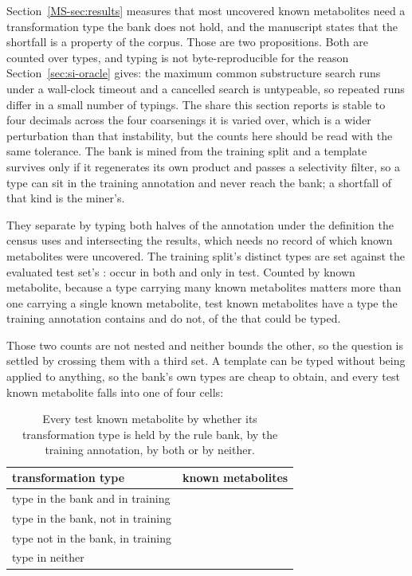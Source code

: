 \documentclass[journal=jcisd8,manuscript=suppinfo,layout=onecolumn]{achemso}
\begin{document}
Section~\ref{MS-sec:results} measures that most uncovered known metabolites need a transformation type the
bank does not hold, and the manuscript states that the shortfall is a property of the corpus. Those
are two propositions. Both are counted over types, and typing is not byte-reproducible for the
reason Section~\ref{sec:si-oracle} gives: the maximum common substructure search runs under a
wall-clock timeout and a cancelled search is untypeable, so repeated runs differ in a small number
of typings. The share this section reports is stable to four decimals across the four coarsenings
it is varied over, which is a wider perturbation than that instability, but the counts here should
be read with the same tolerance. The bank is mined from the training split and a template survives
only if it
regenerates its own product and passes a selectivity filter, so a type can sit in the training
annotation and never reach the bank; a shortfall of that kind is the miner's.

They separate by typing both halves of the annotation under the definition the census uses and
intersecting the results, which needs no record of which known metabolites were uncovered. The training
split's \numTypeoverlapTraintypes{} distinct types are set against the evaluated test set's
\numTypeoverlapTesttypes: \numTypeoverlapShared{} occur in both and
\numTypeoverlapAbsenttypes{} only in test. Counted by known metabolite, because a type carrying many
known metabolites matters more than one carrying a single known metabolite,
\numTypeoverlapPresentrefs{} test known metabolites have a type the training annotation contains and
\numTypeoverlapAbsentrefs{} do not, \numTypeoverlapAbsentsharePct{} of the
\numTypeoverlapTyped{} that could be typed.

Those two counts are not nested and neither bounds the other, so the question is settled by
crossing them with a third set. A template can be typed
without being applied to anything, so the bank's own \numTypeoverlapBanktypes{} types are cheap to
obtain, and every test known metabolite falls into one of four cells:

\begin{table}[h]
\centering
\caption{Every test known metabolite by whether its transformation type is held by the rule bank, by the
training annotation, by both or by neither.}
\label{tab:si-typeoverlap-cells}
\begin{tabular}{lr}
\toprule
transformation type & known metabolites \\
\midrule
type in the bank and in training & \numTypeoverlapInboth{} \\
type in the bank, not in training & \numTypeoverlapInbankonly{} \\
type not in the bank, in training & \numTypeoverlapMinerslost{} \\
type in neither & \numTypeoverlapCorpuslackstoo{} \\
\bottomrule
\end{tabular}
\end{table}
\end{document}
